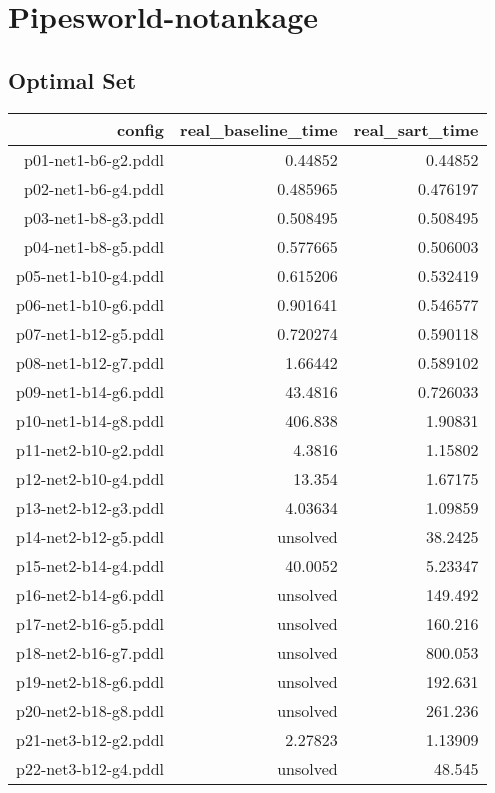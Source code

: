 \documentclass{article}
\begin{document}
                \newpage \section{Pipesworld-notankage}
                    \subsection*{Optimal Set}
                    
                            \begin{center}
                            \scriptsize
                            \begin{tabular}{r|r|r}
                            config & real\_baseline\_time & real\_sart\_time\\\midrule
                             p01-net1-b6-g2.pddl&0.44852&0.44852\\
 p02-net1-b6-g4.pddl&0.485965&0.476197\\
 p03-net1-b8-g3.pddl&0.508495&0.508495\\
 p04-net1-b8-g5.pddl&0.577665&0.506003\\
 p05-net1-b10-g4.pddl&0.615206&0.532419\\
 p06-net1-b10-g6.pddl&0.901641&0.546577\\
 p07-net1-b12-g5.pddl&0.720274&0.590118\\
 p08-net1-b12-g7.pddl&1.66442&0.589102\\
 p09-net1-b14-g6.pddl&43.4816&0.726033\\
 p10-net1-b14-g8.pddl&406.838&1.90831\\
 p11-net2-b10-g2.pddl&4.3816&1.15802\\
 p12-net2-b10-g4.pddl&13.354&1.67175\\
 p13-net2-b12-g3.pddl&4.03634&1.09859\\
 p14-net2-b12-g5.pddl&unsolved&38.2425\\
 p15-net2-b14-g4.pddl&40.0052&5.23347\\
 p16-net2-b14-g6.pddl&unsolved&149.492\\
 p17-net2-b16-g5.pddl&unsolved&160.216\\
 p18-net2-b16-g7.pddl&unsolved&800.053\\
 p19-net2-b18-g6.pddl&unsolved&192.631\\
 p20-net2-b18-g8.pddl&unsolved&261.236\\
 p21-net3-b12-g2.pddl&2.27823&1.13909\\
 p22-net3-b12-g4.pddl&unsolved&48.545\\

\end{tabular}
\end{center}
\end{document}

